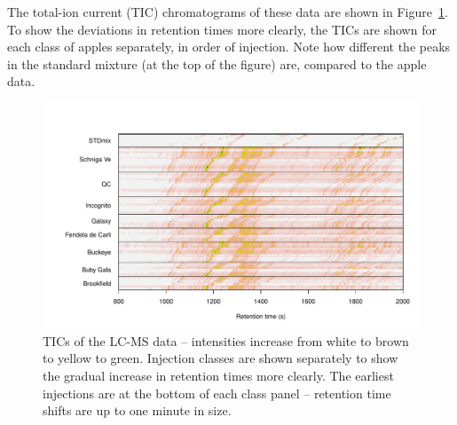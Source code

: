 \documentclass[a4paper,11pt]{article}
\begin{document}
The total-ion current (TIC)
chromatograms of these data are shown in Figure~\ref{fig:tics}. To
show the deviations in retention times more clearly, the TICs are
shown for each class of apples separately, in order of injection. Note
how different the peaks in the standard mixture (at the top of the
figure) are, compared to the apple data.
\begin{figure}[tb]
\centering
{}
\includegraphics{stickPTW-013}
\caption{TICs of the LC-MS data -- intensities increase from white to
  brown to yellow to green. Injection
  classes are shown separately to show the gradual increase in
  retention times more clearly. The earliest injections are at the
  bottom of each class panel -- retention time shifts are up to one
  minute in size.}
\label{fig:tics}
\end{figure}
\end{document}
